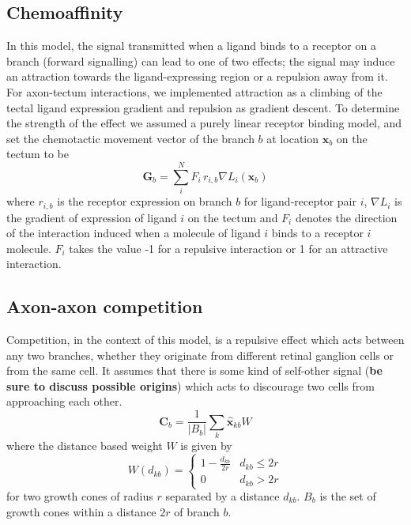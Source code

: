 \documentclass[11pt, a4paper]{article}
\begin{document}
\subsection*{Chemoaffinity}

In this model, the signal transmitted when a ligand binds to a receptor on a
branch (forward signalling) can lead to one of two effects; the signal may
induce an attraction towards the ligand-expressing region or a repulsion away
from it.
%
For axon-tectum interactions, we implemented attraction as a climbing of the
tectal ligand expression gradient and repulsion as gradient descent.
%
To determine the strength of the effect we assumed a purely linear receptor
binding model, and set the chemotactic movement vector of the branch $b$ at
location $\mathbf{x}_b$ on the tectum to be
%
\begin{equation}
\mathbf{G}_b = \sum_i^N F_i\,r_{i,b} \nabla L_i(\mathbf{x}_b)
\end{equation}
%
where $r_{i,b}$ is the receptor expression on branch $b$ for ligand-receptor
pair $i$, $\nabla L_i$ is the gradient of expression of ligand $i$ on the
tectum and $F_i$ denotes the direction of the interaction induced when a
molecule of ligand $i$ binds to a receptor $i$ molecule. $F_i$ takes the value
-1 for a repulsive interaction or 1 for an attractive interaction.

\subsection*{Axon-axon competition}

Competition, in the context of this model, is a repulsive effect which acts
between any two branches, whether they originate from different retinal
ganglion cells or from the same cell. It assumes that there is some kind of
self-other signal (\textbf{be sure to discuss possible origins}) which acts to
discourage two cells from approaching each other.
%
\begin{equation}
\mathbf{C}_b = \frac{1}{|B_b|} \sum_k \hat{\mathbf{x}}_{kb} W
\end{equation}
where the distance based weight $W$ is given by
\begin{equation}
W(d_{kb}) = \begin{cases}
      1 - \frac{d_{kb}}{2r}   & d_{kb} \leq 2r \\
     0 & d_{kb} > 2r
     \end{cases}
\end{equation}
for two growth cones of radius $r$ separated by a distance $d_{kb}$. $B_b$ is
the set of growth cones within a distance $2r$ of branch $b$.
\end{document}
